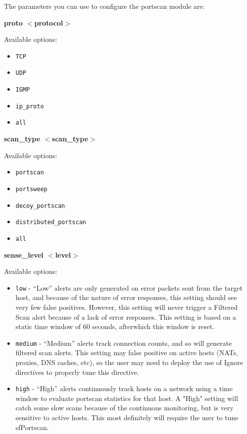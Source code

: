 \documentclass[english]{report}
\newcounter{slistnum}
\newenvironment{slist}
{ \begin{list}{ {\bf \arabic{slistnum}.} }{\usecounter{slistnum} } }
{ \end{list} }
\begin{document}
The parameters you can use to configure the portscan module are:

\begin{slist}
\item \textbf{proto $<$protocol$>$}

Available options:

\begin{itemize}
\item \texttt{TCP}
\item \texttt{UDP}
\item \texttt{IGMP}
\item \texttt{ip\_proto}
\item \texttt{all}
\end{itemize}

\item \textbf{scan\_type $<$scan\_type$>$}

Available options: 

\begin{itemize}
\item \texttt{portscan} 
\item \texttt{portsweep} 
\item \texttt{decoy\_portscan}
\item \texttt{distributed\_portscan}
\item \texttt{all}
\end{itemize}

\item \textbf{sense\_level $<$level$>$}

Available options:

\begin{itemize}

\item \texttt{low} - ``Low'' alerts are only generated on error packets sent
from the target host, and because of the nature of error responses, this
setting should see very few false positives. However, this setting will never
trigger a Filtered Scan alert because of a lack of error responses. This
setting is based on a static time window of 60 seconds, afterwhich this window
is reset.

\item \texttt{medium} - ``Medium'' alerts track connection counts, and so will
generate filtered scan alerts. This setting may false positive on active hosts
(NATs, proxies, DNS caches, etc), so the user may need to deploy the use of
Ignore directives to properly tune this directive.

\item \texttt{high} - ``High'' alerts continuously track hosts on a network
using a time window to evaluate portscan statistics for that host. A "High"
setting will catch some slow scans because of the continuous monitoring, but is
very sensitive to active hosts. This most definitely will require the user to
tune sfPortscan.


\end{itemize}
\end{slist}
\end{document}
